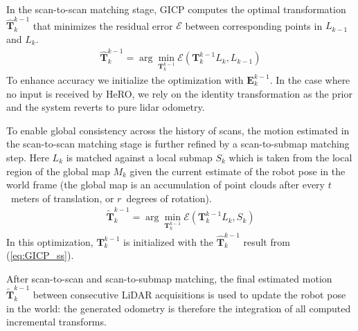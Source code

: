 \documentclass[letterpaper, 10pt, conference]{ieeeconf}      %
\newcommand{\rev}[1]{{\color{blue} #1 }} %
\begin{document}
In the scan-to-scan matching stage, GICP computes the optimal transformation $\hat{\textbf{T}}^{k-1}_{k}$ that minimizes the residual error $\mathcal{E}$ between corresponding points in $L_{k-1}$ and $L_{k}$. 
\begin{align}\label{eq:GICP_ss}
\hat{\textbf{T}}^{k-1}_{k} = \arg\min_{\textbf{T}^{k-1}_{k}} \mathcal{E} (\textbf{T}^{k-1}_{k}L_{k}, L_{k-1})
\end{align}
To enhance accuracy we initialize the optimization with $\textbf{E}^{k-1}_{k}$. In the case where no input is received by HeRO, we rely on the identity transformation as the prior and the system reverts to pure lidar odometry. 

\rev{To enable global consistency across the history of scans, the motion estimated in the scan-to-scan matching stage is further refined by a scan-to-submap matching step. Here $L_k$ is matched against a local submap $S_k$ which is taken from the local region of the global map $M_k$ given the current estimate of the robot pose in the world frame (the global map is an accumulation of point clouds after every $t$~meters of translation, or $r$~degrees of rotation). %
\begin{align}\label{eq:GICP_map}
\tilde{\textbf{T}}^{k-1}_{k} = \arg\min_{\textbf{T}^{k-1}_{k}} \mathcal{E} (\textbf{T}^{k-1}_{k}L_{k}, S_{k})
\end{align}
In this optimization, $\textbf{T}^{k-1}_{k}$ is initialized with the $\hat{\textbf{T}}^{k-1}_{k}$ result from (\ref{eq:GICP_ss}). 

After scan-to-scan and scan-to-submap matching, the final estimated motion $\tilde{\textbf{T}}^{k-1}_{k}$ between consecutive LiDAR acquisitions is used to update the robot pose in the world: the generated odometry is therefore the integration of all computed incremental transforms. 

}
\end{document}
